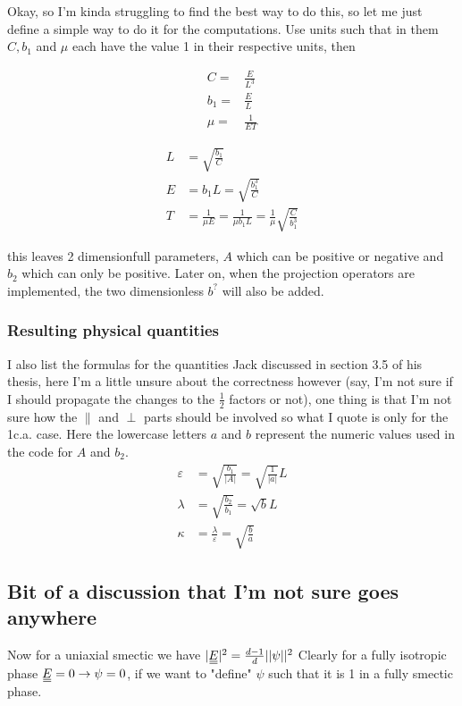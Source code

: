 \documentclass[11pt]{article}
\begin{document}
Okay, so I'm kinda struggling to find the best way to do this, so let me just define a simple way to do it for the computations.
Use units such that in them $C, b_1$ and $\mu$ each have the value 1 in their respective units, then
\par\noindent\begin{minipage}{.5\linewidth}
\begin{align}
    C =& \frac{E}{L^3} \nonumber \\
    b_1 =& \frac{E}{L} \\
    \mu =& \frac{1}{E T} \nonumber
\end{align}
\end{minipage}
\noindent\begin{minipage}{.5\linewidth}
\begin{align}
     L &= \sqrt{\frac{b_1}{C}} \nonumber \\
     E &= b_1 L = \sqrt{\frac{b_1^3}{C}} \\
     T &= \frac{1}{\mu E} = \frac{1}{\mu b_1 L} = \frac{1}{\mu} \sqrt{\frac{C}{b_1^3}} \nonumber
\end{align}
\end{minipage}
this leaves 2 dimensionfull parameters, $A$ which can be positive or negative and $b_2$ which can only be positive.
Later on, when the projection operators are implemented, the two dimensionless $b^?$ will also be added.

\subsubsection*{Resulting physical quantities}
I also list the formulas for the quantities Jack discussed in section 3.5 of his thesis, here I'm a little unsure about the correctness however (say, I'm not sure if I should propagate the changes to the $\frac{1}{2}$ factors or not), one thing is that I'm not sure how the $\parallel$ and $\perp$ parts should be involved so what I quote is only for the 1c.a. case.
Here the lowercase letters $a$ and $b$ represent the numeric values used in the code for $A$ and $b_2$.
\begin{align}
    \varepsilon &= \sqrt{\frac{b_1}{|A|}} = \sqrt{\frac{1}{|a|}} L \\
    \lambda &= \sqrt{\frac{b_2}{b_1}} = \sqrt{b} L \\
    \kappa &= \frac{\lambda}{\varepsilon} = \sqrt{\frac{b}{a}}
\end{align}


\vspace{3em}
\subsection*{Bit of a discussion that I'm not sure goes anywhere}
Now for a uniaxial smectic we have $|\du{E}|^2 = \frac{d-1}{d}||\psi||^2$
Clearly for a fully isotropic phase $\du{E} = 0 \rightarrow \psi = 0$, if we want to "define" $\psi$ such that it is 1 in a fully smectic phase.
\end{document}
